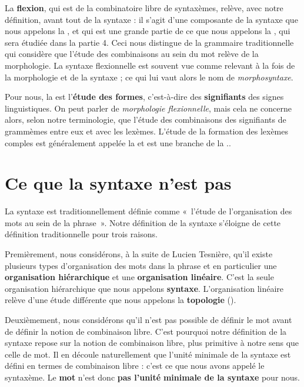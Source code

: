 La \textbf{flexion}, qui est de la combinatoire libre de syntaxèmes, relève, avec notre définition, avant tout de la syntaxe : il s’agit d’une composante de la syntaxe que nous appelons la , et qui est une grande partie de ce que nous appelons la , qui sera étudiée dans la partie 4. Ceci nous distingue de la grammaire traditionnelle qui considère que l’étude des combinaisons au sein du mot relève de la morphologie. La syntaxe flexionnelle est souvent vue comme relevant à la fois de la morphologie et de la syntaxe ; ce qui lui vaut alors le nom de \textit{morphosyntaxe}.

Pour nous, la  est l’\textbf{étude des formes}, c’est-à-dire des \textbf{signifiants} des signes linguistiques. On peut parler de \textit{morphologie flexionnelle}, mais cela ne concerne alors, selon notre terminologie, que l’étude des combinaisons des signifiants de grammèmes entre eux et avec les lexèmes. L’étude de la formation des lexèmes comples est généralement appelée la  et est une branche de la ..

\section{Ce que la syntaxe n’est pas}\label{sec:3.1.7}

La syntaxe est traditionnellement définie comme «~l’étude de l’organisation des mots au sein de la phrase~». Notre définition de la syntaxe s’éloigne de cette définition traditionnelle pour trois raisons.

Premièrement, nous considérons, à la suite de Lucien Tesnière, qu’il existe plusieurs types d’organisation des mots dans la phrase et en particulier une \textbf{organisation hiérarchique} et une \textbf{organisation linéaire}. C’est la seule organisation hiérarchique que nous appelons \textbf{syntaxe}. L’organisation linéaire relève d’une étude différente que nous appelons la \textbf{topologie} ().

Deuxièmement, nous considérons qu’il n’est pas possible de définir le mot avant de définir la notion de combinaison libre. C’est pourquoi notre définition de la syntaxe repose sur la notion de combinaison libre, plus primitive à notre sens que celle de mot. Il en découle naturellement que l’unité minimale de la syntaxe est défini en termes de combinaison libre : c’est ce que nous avons appelé le syntaxème. Le \textbf{mot} n’est donc \textbf{pas l’unité} \textbf{minimale de la syntaxe} pour nous.

